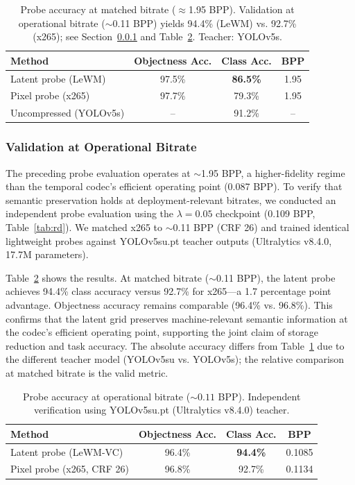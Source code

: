 \documentclass{article}
\begin{document}
\begin{table}[ht]
\centering
\caption{Probe accuracy at matched bitrate ($\approx$1.95 BPP). Validation at operational bitrate ($\sim$0.11 BPP) yields 94.4\% (LeWM) vs. 92.7\% (x265); see Section~\ref{sec:probe_operational} and Table~\ref{tab:probe_operational}. Teacher: YOLOv5s.}
\label{tab:probe}
\vspace{4pt}
\begin{tabular}{lccc}
\toprule
Method               & Objectness Acc. & Class Acc. & BPP   \\
\midrule
Latent probe (LeWM)  & 97.5\%          & \textbf{86.5\%} & 1.95  \\
Pixel probe (x265)   & 97.7\%          & 79.3\%          & 1.95  \\
Uncompressed (YOLOv5s) & --            & 91.2\%          & --    \\
\bottomrule
\end{tabular}
\end{table}

\subsubsection{Validation at Operational Bitrate}
\label{sec:probe_operational}

The preceding probe evaluation operates at $\sim$1.95 BPP, a higher-fidelity regime than the temporal codec's efficient operating point (0.087 BPP). To verify that semantic preservation holds at deployment-relevant bitrates, we conducted an independent probe evaluation using the $\lambda{=}0.05$ checkpoint (0.109 BPP, Table~\ref{tab:rd}). We matched x265 to $\sim$0.11 BPP (CRF 26) and trained identical lightweight probes against YOLOv5su.pt teacher outputs (Ultralytics v8.4.0, 17.7M parameters).

Table~\ref{tab:probe_operational} shows the results. At matched bitrate ($\sim$0.11 BPP), the latent probe achieves 94.4\% class accuracy versus 92.7\% for x265---a 1.7 percentage point advantage. Objectness accuracy remains comparable (96.4\% vs. 96.8\%). This confirms that the latent grid preserves machine-relevant semantic information at the codec's efficient operating point, supporting the joint claim of storage reduction and task accuracy. The absolute accuracy differs from Table~\ref{tab:probe} due to the different teacher model (YOLOv5su vs. YOLOv5s); the relative comparison at matched bitrate is the valid metric.

\begin{table}[ht]
\centering
\caption{Probe accuracy at operational bitrate (${\sim}0.11$ BPP). Independent verification using YOLOv5su.pt (Ultralytics v8.4.0) teacher.}
\label{tab:probe_operational}
\vspace{4pt}
\begin{tabular}{lccc}
\toprule
Method & Objectness Acc. & Class Acc. & BPP \\
\midrule
Latent probe (LeWM-VC) & 96.4\% & \textbf{94.4\%} & 0.1085 \\
Pixel probe (x265, CRF 26) & 96.8\% & 92.7\% & 0.1134 \\
\bottomrule
\end{tabular}
\end{table}
\end{document}

